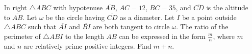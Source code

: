 In right $ \triangle ABC$ with hypotenuse $ \overline{AB}$, $ AC = 12$, $ BC = 35$, and $ \overline{CD}$ is the altitude to $ \overline{AB}$. Let $ \omega$ be the circle having $ \overline{CD}$ as a diameter. Let $ I$ be a point outside $ \triangle ABC$ such that $ \overline{AI}$ and $ \overline{BI}$ are both tangent to circle $ \omega$. The ratio of the perimeter of $ \triangle ABI$ to the length $ AB$ can be expressed in the form $ \displaystyle\frac{m}{n}$, where $ m$ and $ n$ are relatively prime positive integers. Find $ m+n$.